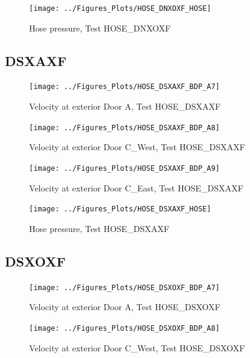 \documentclass[11pt,oneside]{book}
\begin{document}
\begin{figure}[!ht]
\texttt{[image: ../Figures\_Plots/HOSE\_DNXOXF\_HOSE]}
\caption{Hose pressure, Test HOSE\_DNXOXF}
\label{fig:HOSE_DNXOXF_HOSE}
\end{figure}


\clearpage


\subsection{DSXAXF}

\begin{figure}[!ht]
\texttt{[image: ../Figures\_Plots/HOSE\_DSXAXF\_BDP\_A7]}
\caption{Velocity at exterior Door A, Test HOSE\_DSXAXF}
\label{fig:HOSE_DSXAXF_BDP_A7}
\end{figure}

\begin{figure}[!ht]
\texttt{[image: ../Figures\_Plots/HOSE\_DSXAXF\_BDP\_A8]}
\caption{Velocity at exterior Door C\_West, Test HOSE\_DSXAXF}
\label{fig:HOSE_DSXAXF_BDP_A8}
\end{figure}

\begin{figure}[!ht]
\texttt{[image: ../Figures\_Plots/HOSE\_DSXAXF\_BDP\_A9]}
\caption{Velocity at exterior Door C\_East, Test HOSE\_DSXAXF}
\label{fig:HOSE_DSXAXF_BDP_A9}
\end{figure}

\begin{figure}[!ht]
\texttt{[image: ../Figures\_Plots/HOSE\_DSXAXF\_HOSE]}
\caption{Hose pressure, Test HOSE\_DSXAXF}
\label{fig:HOSE_DSXAXF_HOSE}
\end{figure}


\clearpage


\subsection{DSXOXF}

\begin{figure}[!ht]
\texttt{[image: ../Figures\_Plots/HOSE\_DSXOXF\_BDP\_A7]}
\caption{Velocity at exterior Door A, Test HOSE\_DSXOXF}
\label{fig:HOSE_DSXOXF_BDP_A7}
\end{figure}

\begin{figure}[!ht]
\texttt{[image: ../Figures\_Plots/HOSE\_DSXOXF\_BDP\_A8]}
\caption{Velocity at exterior Door C\_West, Test HOSE\_DSXOXF}
\label{fig:HOSE_DSXOXF_BDP_A8}
\end{figure}
\end{document}
